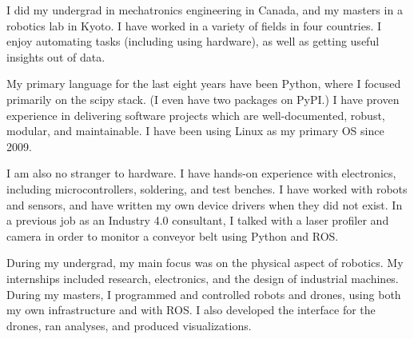 I did my undergrad in mechatronics engineering in Canada, and my masters in a robotics lab in Kyoto. I have worked in a variety of fields in four countries. I enjoy automating tasks (including using hardware), as well as getting useful insights out of data.

My primary language for the last eight years have been Python, where I focused primarily on the scipy stack. (I even have two packages on PyPI.) I have proven experience in delivering software projects which are well-documented, robust, modular, and maintainable. I have been using Linux as my primary OS since 2009.

I am also no stranger to hardware. I have hands-on experience with electronics, including microcontrollers, soldering, and test benches. I have worked with robots and sensors, and have written my own device drivers when they did not exist. In a previous job as an Industry 4.0 consultant, I talked with a laser profiler and camera in order to monitor a conveyor belt using Python and ROS.

During my undergrad, my main focus was on the physical aspect of robotics. My internships included research, electronics, and the design of industrial machines. During my masters, I programmed and controlled robots and drones, using both my own infrastructure and with ROS. I also developed the interface for the drones, ran analyses, and produced visualizations.

